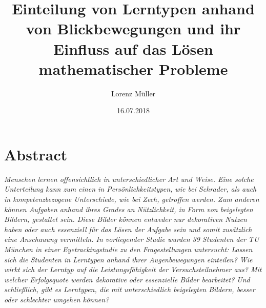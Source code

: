 %
% 
% 
%



\renewcommand{\Thema}{%
    Einteilung von Lerntypen anhand von Blickbewegungen und ihr Einfluss auf das Lösen 
    mathematischer Probleme}






\title{Einteilung von Lerntypen anhand von Blickbewegungen und ihr Einfluss auf das Lösen 
        mathematischer Probleme}
\author{Lorenz Müller}
\date{16.07.2018}


\section*{Abstract}

\textit{Menschen lernen offensichtlich in unterschiedlicher Art und Weise. Eine solche Unterteilung kann zum einen in Persönlichkeitstypen, wie bei Schrader, als auch in kompetenzbezogene Unterschiede, wie bei Zech, getroffen werden. Zum anderen können Aufgaben anhand ihres Grades an Nützlichkeit, in Form von beigelegten Bildern, gestaltet sein. Diese Bilder können entweder nur dekorativen Nutzen haben oder auch essenziell für das Lösen der Aufgabe sein und somit zusätzlich eine Anschauung vermitteln. In vorliegender Studie wurden 39 Studenten der TU München in einer Eyetrackingstudie zu den Fragestellungen untersucht: Lassen sich die Studenten in Lerntypen anhand ihrer Augenbewegungen einteilen? Wie wirkt sich der Lerntyp auf die Leistungsfähigkeit der Versuchsteilnehmer aus? Mit welcher Erfolgsquote werden dekorative oder essenzielle Bilder bearbeitet? Und schließlich, gibt es Lerntypen, die mit unterschiedlich beigelegten Bildern, besser oder schlechter umgehen können?}

